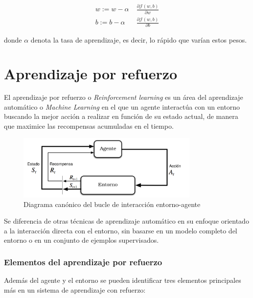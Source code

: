  \begin{align}
 	w:= w - \alpha\; &\frac{\partial\mathcal{J}(w,b)}{\partial w}\\
 	b:= b - \alpha\; &\frac{\partial\mathcal{J}(w,b)}{\partial b}
 \end{align}
 
 donde $\alpha$ denota la tasa de aprendizaje, es decir, lo rápido que varían estos pesos.

 



\section{Aprendizaje por refuerzo}

El aprendizaje por refuerzo o \textit{Reinforcement learning} \cite{sutton2018reinforcement} es un área del aprendizaje automático o \textit{Machine Learning} en el que un agente interactúa con un entorno buscando la mejor acción a realizar en función de su estado actual, de manera que maximice las recompensas acumuladas en el tiempo.


\begin{figure}[htb!]
	\centering
	\includegraphics[width=0.8\textwidth]{background/RL_diagram}
	\caption{Diagrama canónico del bucle de interacción entorno-agente}
	\label{Rl-diagram}
\end{figure}


Se diferencia de otras técnicas de aprendizaje automático en su enfoque orientado a la interacción directa con el entorno, sin basarse en un modelo completo del entorno o en un conjunto de ejemplos supervisados.

\subsubsection{Elementos del aprendizaje por refuerzo}
Además del agente y el entorno se pueden identificar tres elementos principales más en un sistema de aprendizaje con refuerzo:

